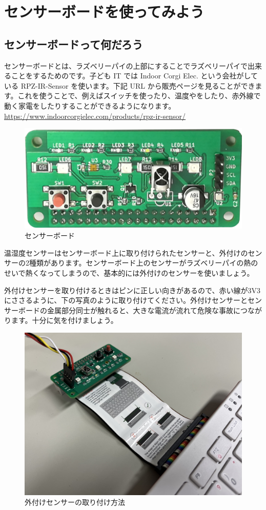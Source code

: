 \newpage
\section{センサーボードを使ってみよう}
\subsection{センサーボードって何だろう}

センサーボードとは、ラズベリーパイの上部にすることでラズベリーパイで出来ることをするためのです。子ども IT では Indoor Corgi Elec. という会社がしている RPZ-IR-Sensor を使います。下記 URL から販売ページを見ることができます。これを使うことで、例えばスイッチを使ったり、温度やをしたり、赤外線で動く家電をしたりすることができるようになります。\\
\url{https://www.indoorcorgielec.com/products/rpz-ir-sensor/}\\

\begin{figure}[H]
    \centering
    \includegraphics[width=0.6\linewidth]{images/chap03/text03-img030.png}
    \caption{センサーボード}
\end{figure}

温湿度センサーはセンサーボード上に取り付けられたセンサーと、外付けのセンサーの2種類があります。センサーボード上のセンサーがラズベリーパイの熱のせいで熱くなってしまうので、基本的には外付けのセンサーを使いましょう。

外付けセンサーを取り付けるときはピンに正しい向きがあるので、赤い線が3V3にささるように、下の写真のように取り付けてください。外付けセンサーとセンサーボードの金属部分同士が触れると、大きな電流が流れて危険な事故につながります。十分に気を付けましょう。

\begin{figure}[H]
    \centering
    \includegraphics[width=0.6\linewidth]{images/chap03/how_to_install_bme280.jpg}
    \caption{外付けセンサーの取り付け方法}
\end{figure}

